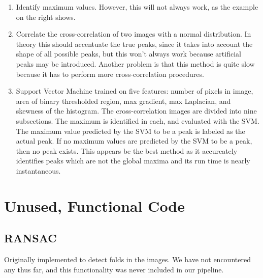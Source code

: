 \documentclass{article}
\begin{document}
\begin{enumerate}
\item Identify maximum values. However, this will not always work, as the example on the right shows.
\item Correlate the cross-correlation of two images with a normal distribution. In theory this should accentuate the true peaks, since it takes into account the shape of all possible peaks, but this won't always work because artificial peaks may be introduced. Another problem is that this method is quite slow because it has to perform more cross-correlation procedures. 
\item Support Vector Machine trained on five features: number of pixels in image, area of binary thresholded region, max gradient, max Laplacian, and skewness of the histogram. The cross-correlation images are divided into nine subsections. The maximum is identified in each, and evaluated with the SVM. The maximum value predicted by the SVM to be a peak is labeled as the actual peak. If no maximum values are predicted by the SVM to be a peak, then no peak exists. This appears be the best method as it accureately identifies peaks which are not the global maxima and its run time is nearly instantaneous. 
\end{enumerate}

\section{Unused, Functional Code}
\subsection{RANSAC}
Originally implemented to detect folds in the images. We have not encountered any thus far, and this functionality was never included in our pipeline.
\end{document}
